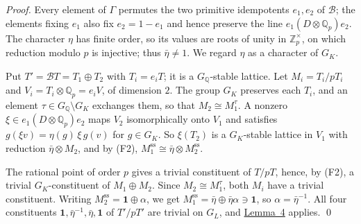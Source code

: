 \documentclass[11pt]{article}
\newcommand{\Q}{\mathbb Q}
\newcommand{\Z}{\mathbb Z}
\begin{document}
\emph{Proof.} Every element of \(\Gamma\) permutes the two primitive idempotents \(e_1,e_2\) of
\(\mathcal B\); the elements fixing \(e_1\) also fix \(e_2=1-e_1\) and hence preserve the line
\(e_1(D\otimes\Q_p)e_2\). The character \(\eta\) has finite order, so its values are roots of
unity in \(\Z_p^\times\), on which reduction modulo \(p\) is injective; thus
\(\bar\eta\neq1\). We regard \(\eta\) as a character of \(G_K\).

Put \(T'=\mathcal BT=T_1\oplus T_2\) with \(T_i=e_iT\); it is a \(G_{\Q}\)-stable lattice. Let
\(M_i=T_i/pT_i\) and \(V_i=T_i\otimes\Q_p=e_iV\), of dimension \(2\). The group \(G_K\) preserves
each \(T_i\), and an element \(\tau\in G_{\Q}\setminus G_K\) exchanges them, so that
\(M_2\cong M_1^{\tau}\). A nonzero \(\xi\in e_1(D\otimes\Q_p)e_2\) maps \(V_2\) isomorphically
onto \(V_1\) and satisfies \(g(\xi v)=\eta(g)\,\xi\,g(v)\) for \(g\in G_K\). So \(\xi(T_2)\) is a
\(G_K\)-stable lattice in \(V_1\) with reduction \(\bar\eta\otimes M_2\), and by (F2),
\(M_1^{\mathrm{ss}}\cong\bar\eta\otimes M_2^{\mathrm{ss}}\).

The rational point of order \(p\) gives a trivial constituent of \(T/pT\), hence, by (F2), a
trivial \(G_K\)-constituent of \(M_1\oplus M_2\). Since \(M_2\cong M_1^\tau\), both \(M_i\) have
a trivial constituent. Writing \(M_2^{\mathrm{ss}}=\mathbf 1\oplus\alpha\), we get
\(M_1^{\mathrm{ss}}=\bar\eta\oplus\bar\eta\alpha\ni\mathbf 1\), so \(\alpha=\bar\eta^{-1}\). All
four constituents \(\mathbf 1,\bar\eta^{-1},\bar\eta,\mathbf 1\) of \(T'/pT'\) are trivial on
\(G_L\), and \hyperref[lemma-pol]{Lemma~4} applies. \qed
\end{document}
